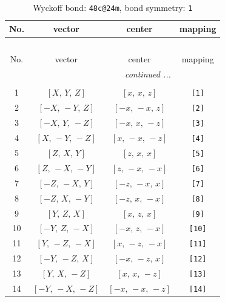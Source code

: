 \documentclass[fleqn,8pt]{jsarticle}
\begin{document}
\begin{longtable}{cccc}
\caption{Wyckoff bond: {\tt 48c@24m}, bond symmetry: {\tt 1}}
 \\
 \hline \hline
No. & vector & center & mapping \\ \hline \endfirsthead

\multicolumn{3}{l}{\tablename\ \thetable{}} \\
 \hline \hline
No. & vector & center & mapping \\ \hline \endhead

 \hline \hline
\multicolumn{3}{r}{\footnotesize\it continued ...} \\ \endfoot

 \hline \hline
\multicolumn{3}{r}{} \\ \endlastfoot

1 & $\left[ X,\, Y,\, Z \right]$ & $\left[ x,\, x,\, z \right]$ & {\tt [1]} \\ \hline
2 & $\left[ - X,\, - Y,\, Z \right]$ & $\left[ - x,\, - x,\, z \right]$ & {\tt [2]} \\ \hline
3 & $\left[ - X,\, Y,\, - Z \right]$ & $\left[ - x,\, x,\, - z \right]$ & {\tt [3]} \\ \hline
4 & $\left[ X,\, - Y,\, - Z \right]$ & $\left[ x,\, - x,\, - z \right]$ & {\tt [4]} \\ \hline
5 & $\left[ Z,\, X,\, Y \right]$ & $\left[ z,\, x,\, x \right]$ & {\tt [5]} \\ \hline
6 & $\left[ Z,\, - X,\, - Y \right]$ & $\left[ z,\, - x,\, - x \right]$ & {\tt [6]} \\ \hline
7 & $\left[ - Z,\, - X,\, Y \right]$ & $\left[ - z,\, - x,\, x \right]$ & {\tt [7]} \\ \hline
8 & $\left[ - Z,\, X,\, - Y \right]$ & $\left[ - z,\, x,\, - x \right]$ & {\tt [8]} \\ \hline
9 & $\left[ Y,\, Z,\, X \right]$ & $\left[ x,\, z,\, x \right]$ & {\tt [9]} \\ \hline
10 & $\left[ - Y,\, Z,\, - X \right]$ & $\left[ - x,\, z,\, - x \right]$ & {\tt [10]} \\ \hline
11 & $\left[ Y,\, - Z,\, - X \right]$ & $\left[ x,\, - z,\, - x \right]$ & {\tt [11]} \\ \hline
12 & $\left[ - Y,\, - Z,\, X \right]$ & $\left[ - x,\, - z,\, x \right]$ & {\tt [12]} \\ \hline
13 & $\left[ Y,\, X,\, - Z \right]$ & $\left[ x,\, x,\, - z \right]$ & {\tt [13]} \\ \hline
14 & $\left[ - Y,\, - X,\, - Z \right]$ & $\left[ - x,\, - x,\, - z \right]$ & {\tt [14]} \\ \hline

\end{longtable}
\end{document}
